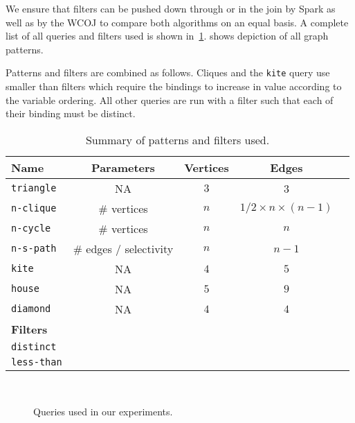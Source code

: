 We ensure that filters can be pushed down through or in the join by Spark as well as by the WCOJ to compare both algorithms on an equal basis.
A complete list of all queries and filters used is shown in~\cref{table:patterns}.
 shows depiction of all graph patterns.

Patterns and filters are combined as follows.
Cliques and the \texttt{kite} query use smaller than filters which require the bindings to increase
in value according to the variable ordering.
All other queries are run with a filter such that each of their binding must be distinct.

\begin{table}[]
    \centering
    \begin{tabular}{@{}lcccp{6cm}@{}}
        \toprule
        Name     & Parameters                 & Vertices & Edges

        \\ \midrule
        \texttt{triangle} & NA                          & $3$        & 3                 \\
        \texttt{n-clique} & \# vertices                & $n$        & $1/2 \times n \times (n - 1)$ \\
        \texttt{n-cycle}  & \# vertices                & $n$        & $n$                 \\
        \texttt{n-s-path} & \# edges / selectivity  & $n$       & $n - 1$                 \\
    \texttt{kite}  & NA                         & $4$        & $5$                    \\
        \texttt{house}    & NA                         & $5$        & $9$                 \\
        \texttt{diamond}  & NA                         & $4$        & $4$                 \\
        \textbf{Filters}   &                            &          &                   \\
        \texttt{distinct}  &                            &          &                   \\
        \texttt{less-than} &                            &          &                   \\ \bottomrule
    \end{tabular}
    \caption{Summary of patterns and filters used.}
    \label{table:patterns}
\end{table}

\begin{figure}
    \centering
    \subfloat[triangle]{}
    \subfloat[4-clique]{}
    \subfloat[5-clique]{}
    \subfloat[4-cycle]{}\\
    \subfloat[5-cycle]{}
    \subfloat[diamond]{}
    \subfloat[kite]{}
    \caption{Queries used in our experiments.}
    \label{fig:all-queries}
\end{figure}

